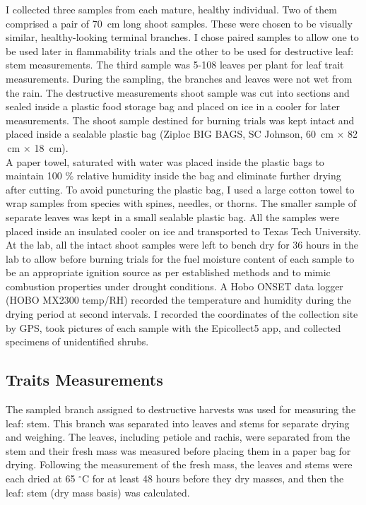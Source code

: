 \documentclass[12pt]{report}
\begin{document}
I collected three samples from each mature, healthy individual. Two of them comprised a pair of 70 \,cm long shoot samples. These were chosen to be visually similar, healthy-looking terminal branches. I chose paired samples to allow one to be used later in flammability trials and the other to be used for destructive leaf: stem measurements. The third sample was 5-108 leaves per plant for leaf trait measurements. During the sampling, the branches and leaves were not wet from the rain.  The destructive measurements shoot sample was cut into sections and sealed inside a plastic food storage bag and placed on ice in a cooler for later measurements. The shoot sample destined for burning trials was kept intact and placed inside a sealable plastic bag (Ziploc BIG BAGS, SC Johnson, 60 \,cm × 82 \,cm × 18 \,cm).\\

A paper towel, saturated with water was placed inside the plastic bags to maintain 100 \% relative humidity inside the bag and eliminate further drying after cutting. To avoid puncturing the plastic bag, I used a large cotton towel to wrap samples from species with spines, needles, or thorns. The smaller sample of separate leaves was kept in a small sealable plastic bag. All the samples were placed inside an insulated cooler on ice and transported to Texas Tech University. At the lab, all the intact shoot samples were left to bench dry for 36 hours in the lab to allow before burning trials for the fuel moisture content of each sample to be an appropriate ignition source as per established methods \citep{wyse2016quantitative} and to mimic combustion properties under drought conditions. A Hobo ONSET data logger (HOBO MX2300 temp/RH) recorded the temperature and humidity during the drying period at second intervals. I recorded the coordinates of the collection site by GPS, took pictures of each sample with the Epicollect5 app, and collected specimens of unidentified shrubs.



\subsection{Traits Measurements}
The sampled branch assigned to destructive harvests was used for measuring the leaf: stem. This branch was separated into leaves and stems for separate drying and weighing. The leaves, including petiole and rachis, were separated from the stem and their fresh mass was measured before placing them in a paper bag for drying. Following the measurement of the fresh mass, the leaves and stems were each dried at 65 $^{\circ}$C for at least 48 hours before they dry masses, and then the leaf: stem (dry mass basis) was calculated.\\
\end{document}
